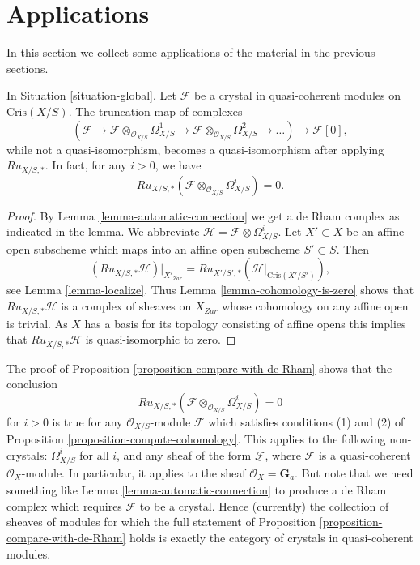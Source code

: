 \section{Applications}
\label{section-applications}

\noindent
In this section we collect some applications of the material in
the previous sections.

\begin{proposition}
\label{proposition-compare-with-de-Rham}
In Situation \ref{situation-global}.
Let $\mathcal{F}$ be a crystal in quasi-coherent modules on
$\text{Cris}(X/S)$. The truncation map of complexes
$$
(\mathcal{F} \to
\mathcal{F} \otimes_{\mathcal{O}_{X/S}} \Omega^1_{X/S} \to
\mathcal{F} \otimes_{\mathcal{O}_{X/S}} \Omega^2_{X/S} \to \ldots)
\longrightarrow \mathcal{F}[0],
$$
while not a quasi-isomorphism, becomes a quasi-isomorphism after applying
$Ru_{X/S, *}$. In fact, for any $i > 0$, we have 
$$
Ru_{X/S, *}(\mathcal{F} \otimes_{\mathcal{O}_{X/S}} \Omega^i_{X/S}) = 0.
$$
\end{proposition}

\begin{proof}
By Lemma \ref{lemma-automatic-connection} we get a de Rham complex
as indicated in the lemma. We abbreviate
$\mathcal{H} = \mathcal{F} \otimes \Omega^i_{X/S}$.
Let $X' \subset X$ be an affine open
subscheme which maps into an affine open subscheme $S' \subset S$.
Then
$$
(Ru_{X/S, *}\mathcal{H})|_{X'_{Zar}} =
Ru_{X'/S', *}(\mathcal{H}|_{\text{Cris}(X'/S')}),
$$
see Lemma \ref{lemma-localize}. Thus
Lemma \ref{lemma-cohomology-is-zero}
shows that $Ru_{X/S, *}\mathcal{H}$ is a complex of sheaves on
$X_{Zar}$ whose cohomology on any affine open is trivial.
As $X$ has a basis for its topology consisting of affine opens
this implies that $Ru_{X/S, *}\mathcal{H}$ is quasi-isomorphic to zero.
\end{proof}

\begin{remark}
\label{remark-vanishing}
The proof of Proposition \ref{proposition-compare-with-de-Rham}
shows that the conclusion
$$
Ru_{X/S, *}(\mathcal{F} \otimes_{\mathcal{O}_{X/S}} \Omega^i_{X/S}) = 0
$$
for $i > 0$ is true for any $\mathcal{O}_{X/S}$-module
$\mathcal{F}$ which satisfies conditions (1) and (2) of
Proposition \ref{proposition-compute-cohomology}.
This applies to the following non-crystals:
$\Omega^i_{X/S}$ for all $i$, and any sheaf of the form
$\underline{\mathcal{F}}$, where $\mathcal{F}$ is a quasi-coherent
$\mathcal{O}_X$-module. In particular, it applies to the
sheaf $\underline{\mathcal{O}_X} = \underline{\mathbf{G}_a}$.
But note that we need something like Lemma \ref{lemma-automatic-connection}
to produce a de Rham complex which requires $\mathcal{F}$ to be a crystal.
Hence (currently) the collection of sheaves of modules for which the full
statement of Proposition \ref{proposition-compare-with-de-Rham} holds
is exactly the category of crystals in quasi-coherent modules.
\end{remark}

